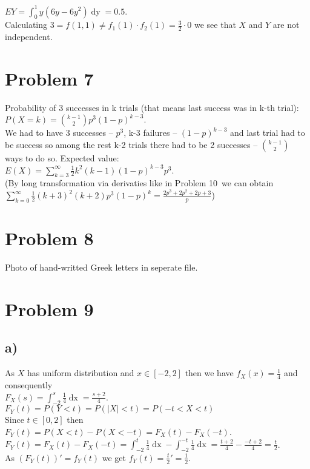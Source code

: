 \documentclass[11pt,wide]{article}
\begin{document}
\( \displaystyle EY = \int_0^1 y(6 y - 6 y^2) \mathop{dy} = 0.5\).\\
Calculating \( \displaystyle 3=f(1,1)\neq f_1(1) \cdot f_2(1) = \frac{3}{2} \cdot 0\) we see that $X$ and $Y$ are not independent.

\section{Problem 7\textdegree}
Probability of 3 successes in k trials (that means last success was in k-th trial): \\
\(\displaystyle P(X=k) = \binom{k-1}{2}p^3(1-p)^{k-3} \).\\
We had to have 3 successes -- $p^3$, k-3 failures -- $(1-p)^{k-3}$ and last trial had to be success so among the rest k-2 trials there had to be 2 successes -- $\binom{k-1}{2}$ ways to do so.
Expected value: \\
\(\displaystyle E(X) = \sum_{k=3}^{\infty}\frac{1}{2} k^2(k-1)(1-p)^{k-3}p^3  \). \\
(By long transformation via derivaties like in Problem 10\textdegree~we can obtain \(\sum_{k=0}^{\infty}\frac{1}{2} (k + 3)^2 (k + 2) p^3 (1 - p)^k = \frac{2 p^3 + 2 p^2 + 2 p + 3}{p} \))

\section{Problem 8\textdegree}
Photo of hand-writted Greek letters in seperate file.

\section{Problem 9\textdegree}
\subsection{a)}
As $X$ has uniform distribution and $x \in [-2,2]$ then we have $f_X(x)=\frac{1}{4}$ and consequently \\
\(\displaystyle F_X(s) = \int_{-2}^s \frac{1}{4} \mathop{dx} = \frac{s+2}{4}\).\\
\(F_Y(t) = P(Y<t) = P(|X|<t) = P(-t<X<t)\)\\
Since $t \in [0,2]$ then 
\(F_Y(t) = P(X<t) - P(X<-t) = F_X(t) - F_X(-t)\).\\
\(\displaystyle F_Y(t) = F_X(t) - F_X(-t) = \int_{-2}^t \frac{1}{4} \mathop{dx} - \int_{-2}^{-t} \frac{1}{4} \mathop{dx} = 
\frac{t+2}{4} - \frac{-t+2}{4} = \frac{t}{2} \).\\
As \(\displaystyle (F_Y(t))' = f_Y(t) \) we get \(\displaystyle f_Y(t) = \frac{t}{2}' = \frac{1}{2} \).
\end{document}
